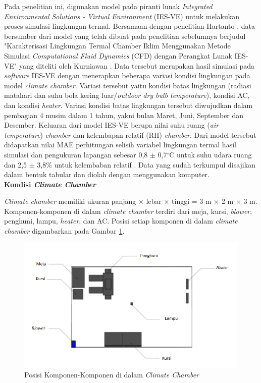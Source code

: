 Pada penelitian ini, digunakan model pada piranti lunak \textit{Integrated Environmental Solutions - Virtual Environment} (IES-VE) untuk melakukan proses simulasi lingkungan termal. Bersamaan dengan penelitian Hartanto \cite{skripsiTanto}, data bersumber dari model yang telah dibuat pada penelitian sebelumnya berjudul "Karakterisasi Lingkungan Termal Chamber Iklim Menggunakan Metode Simulasi \textit{Computational Fluid Dynamics} (CFD) dengan Perangkat Lunak IES-VE" yang diteliti oleh Kurniawan \cite{skripsiIchfan}.  Data tersebut merupakan hasil simulasi pada \textit{software} IES-VE dengan menerapkan beberapa variasi kondisi lingkungan pada model \textit{climate chamber}. Variasi tersebut yaitu kondisi batas lingkungan (radiasi matahari dan suhu bola kering luar/\textit{outdoor dry bulb temperature}), kondisi AC, dan kondisi \textit{heater}. Variasi kondisi batas lingkungan tersebut diwujudkan dalam pembagian 4 musim dalam 1 tahun, yakni bulan Maret, Juni, September dan Desember. Keluaran dari model IES-VE berupa nilai suhu ruang (\textit{air temperature}) \textit{chamber} dan kelembapan relatif (RH) \textit{chamber}. Dari model tersebut didapatkan nilai MAE perhitungan selisih variabel lingkungan termal hasil simulasi dan pengukuran lapangan sebesar 0,8 $\pm$ 0,7$^{\circ}$C untuk suhu udara ruang dan 2,5 $\pm$ 3,8\% untuk kelembaban relatif \cite{skripsiIchfan}. Data yang sudah terkumpul disajikan dalam bentuk tabular dan diolah dengan menggunakan komputer.\\

\noindent\textbf{Kondisi \textit{Climate Chamber}}

\textit{Climate chamber} memiliki ukuran panjang $\times$ lebar $\times$ tinggi = 3 m $\times$ 2 m $\times$ 3 m. Komponen-komponen di dalam \textit{climate chamber} terdiri dari meja, kursi, \textit{blower}, penghuni, lampu, \textit{heater}, dan AC. Posisi setiap komponen di dalam \textit{climate chamber} digambarkan pada Gambar \ref{fig:4:KondisiChamber}.

\begin{figure}[!h]
	\centering
	\includegraphics[width=1\textwidth]{figures/KondisiChamber}
	\caption{Posisi Komponen-Komponen di dalam \textit{Climate Chamber}}
	\label{fig:4:KondisiChamber}
\end{figure}

